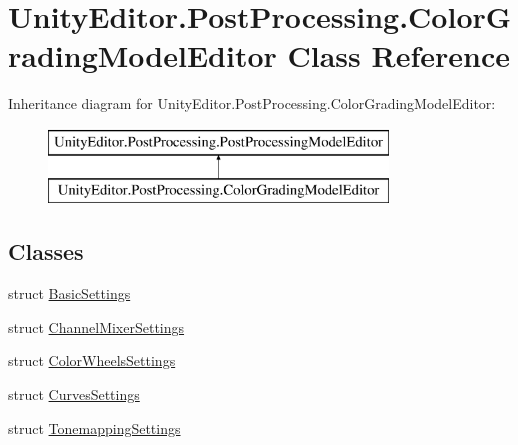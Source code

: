 \hypertarget{class_unity_editor_1_1_post_processing_1_1_color_grading_model_editor}{}\section{Unity\+Editor.\+Post\+Processing.\+Color\+Grading\+Model\+Editor Class Reference}
\label{class_unity_editor_1_1_post_processing_1_1_color_grading_model_editor}
Inheritance diagram for Unity\+Editor.\+Post\+Processing.\+Color\+Grading\+Model\+Editor\+:\begin{figure}[H]
\begin{center}
\leavevmode
\includegraphics[height=2.000000cm]{class_unity_editor_1_1_post_processing_1_1_color_grading_model_editor}
\end{center}
\end{figure}
\subsection*{Classes}
\begin{DoxyCompactItemize}
\item 
struct \hyperlink{struct_unity_editor_1_1_post_processing_1_1_color_grading_model_editor_1_1_basic_settings}{Basic\+Settings}
\item 
struct \hyperlink{struct_unity_editor_1_1_post_processing_1_1_color_grading_model_editor_1_1_channel_mixer_settings}{Channel\+Mixer\+Settings}
\item 
struct \hyperlink{struct_unity_editor_1_1_post_processing_1_1_color_grading_model_editor_1_1_color_wheels_settings}{Color\+Wheels\+Settings}
\item 
struct \hyperlink{struct_unity_editor_1_1_post_processing_1_1_color_grading_model_editor_1_1_curves_settings}{Curves\+Settings}
\item 
struct \hyperlink{struct_unity_editor_1_1_post_processing_1_1_color_grading_model_editor_1_1_tonemapping_settings}{Tonemapping\+Settings}
\end{DoxyCompactItemize}
